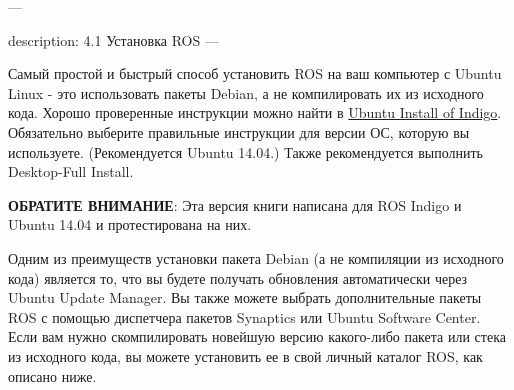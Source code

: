 ---

description: 4.1 Установка ROS
---


Самый простой и быстрый способ установить ROS на ваш компьютер с Ubuntu Linux - это использовать пакеты Debian, а не компилировать их из исходного кода. Хорошо проверенные инструкции можно найти в \href{http://wiki.ros.org/indigo/Installation/Ubuntu}{Ubuntu Install of Indigo}. Обязательно выберите правильные инструкции для версии ОС, которую вы используете. (Рекомендуется Ubuntu 14.04.) Также рекомендуется выполнить Desktop-Full Install.

\textbf{ОБРАТИТЕ ВНИМАНИЕ}: Эта версия книги написана для ROS Indigo и Ubuntu 14.04 и протестирована на них.

Одним из преимуществ установки пакета Debian (а не компиляции из исходного кода) является то, что вы будете получать обновления автоматически через Ubuntu Update Manager. Вы также можете выбрать дополнительные пакеты ROS с помощью диспетчера пакетов Synaptics или Ubuntu Software Center. Если вам нужно скомпилировать новейшую версию какого-либо пакета или стека из исходного кода, вы можете установить ее в свой личный каталог ROS, как описано ниже.

